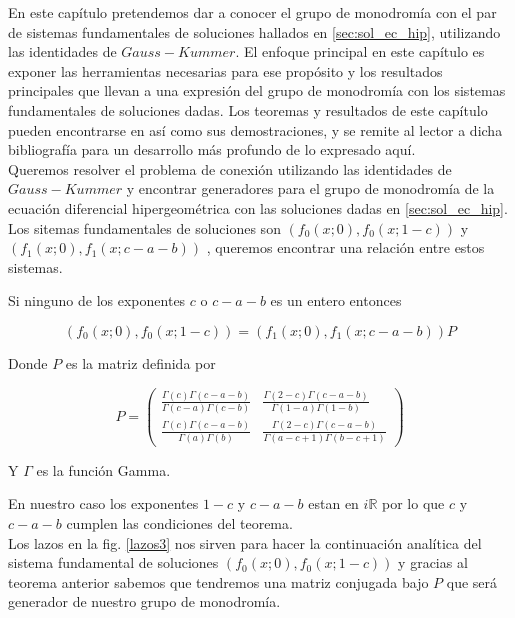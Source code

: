  En este cap\'itulo pretendemos dar a conocer el grupo de monodrom\'ia con el par de sistemas fundamentales de soluciones hallados en \ref{sec:sol_ec_hip}, utilizando las identidades de $Gauss-Kummer$. El enfoque principal en este cap\'itulo es exponer las herramientas necesarias para ese prop\'osito y los resultados principales que llevan a una expresi\'on del grupo de monodrom\'ia con los sistemas fundamentales de soluciones dadas. Los teoremas y resultados de este cap\'itulo pueden encontrarse en \cite{gausspainleve} as\'i como sus demostraciones, y se remite al lector a dicha bibliograf\'ia para un desarrollo m\'as profundo de lo expresado aqu\'i. \\


 Queremos resolver el problema de conexi\'on utilizando las identidades de $Gauss-Kummer$ y encontrar generadores para el grupo de monodrom\'ia de la ecuaci\'on diferencial hipergeom\'etrica con las soluciones dadas en \ref{sec:sol_ec_hip}. Los sitemas fundamentales de soluciones son $(f_{0}(x;0),f_{0}(x;1-c))$ y $(f_{1}(x;0),f_{1}(x;c-a-b))$ , queremos encontrar una relaci\'on entre estos sistemas.

 \begin{thm} Si ninguno de los exponentes $c$ o $c-a-b$ es un entero entonces

 $$ \label{relacion_sistemas_soluciones} (f_{0}(x;0),f_{0}(x;1-c))=(f_{1}(x;0),f_{1}(x;c-a-b))P$$

 Donde $P$ es la matriz definida por

$$ \label{matriz_conexion} P =  \begin{pmatrix}
 \frac{\Gamma(c) \Gamma (c-a-b)}{\Gamma(c-a) \Gamma(c-b)} & \frac{\Gamma(2-c) \Gamma (c-a-b)}{\Gamma(1-a) \Gamma(1-b)}\\
 \frac{\Gamma(c) \Gamma (c-a-b)}{\Gamma(a) \Gamma(b)} & \frac{\Gamma(2-c) \Gamma (c-a-b)}{\Gamma(a-c+1) \Gamma(b-c+1)}
 \end{pmatrix}
$$

Y $\Gamma$ es la funci\'on Gamma.
 \end{thm}

 En nuestro caso los exponentes $1-c$ y $c-a-b$ estan en $i\mathbb{R}$ por lo que $c$ y $c-a-b$ cumplen las condiciones del teorema. \\

 Los lazos en la fig. \ref{lazos3} nos sirven para hacer la continuaci\'on anal\'itica del sistema fundamental de soluciones $(f_{0}(x;0),f_{0}(x;1-c))$ y gracias al teorema anterior sabemos que tendremos una matriz conjugada bajo $P$ que ser\'a generador de nuestro grupo de monodrom\'ia.

